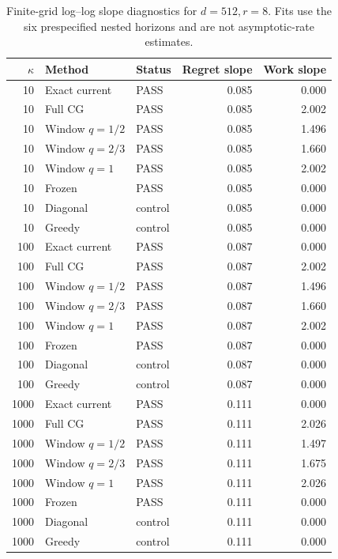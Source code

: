 \begin{table}[p]
\centering\scriptsize
\begin{tabular}{rllrr}
\toprule
$\kappa$ & Method & Status & Regret slope & Work slope \\
\midrule
10 & Exact current & PASS & 0.085 & 0.000 \\
10 & Full CG & PASS & 0.085 & 2.002 \\
10 & Window $q=1/2$ & PASS & 0.085 & 1.496 \\
10 & Window $q=2/3$ & PASS & 0.085 & 1.660 \\
10 & Window $q=1$ & PASS & 0.085 & 2.002 \\
10 & Frozen & PASS & 0.085 & 0.000 \\
10 & Diagonal & control & 0.085 & 0.000 \\
10 & Greedy & control & 0.085 & 0.000 \\
100 & Exact current & PASS & 0.087 & 0.000 \\
100 & Full CG & PASS & 0.087 & 2.002 \\
100 & Window $q=1/2$ & PASS & 0.087 & 1.496 \\
100 & Window $q=2/3$ & PASS & 0.087 & 1.660 \\
100 & Window $q=1$ & PASS & 0.087 & 2.002 \\
100 & Frozen & PASS & 0.087 & 0.000 \\
100 & Diagonal & control & 0.087 & 0.000 \\
100 & Greedy & control & 0.087 & 0.000 \\
1000 & Exact current & PASS & 0.111 & 0.000 \\
1000 & Full CG & PASS & 0.111 & 2.026 \\
1000 & Window $q=1/2$ & PASS & 0.111 & 1.497 \\
1000 & Window $q=2/3$ & PASS & 0.111 & 1.675 \\
1000 & Window $q=1$ & PASS & 0.111 & 2.026 \\
1000 & Frozen & PASS & 0.111 & 0.000 \\
1000 & Diagonal & control & 0.111 & 0.000 \\
1000 & Greedy & control & 0.111 & 0.000 \\
\bottomrule
\end{tabular}
\caption{Finite-grid log--log slope diagnostics for $d=512,r=8$.  Fits use the six prespecified nested horizons and are not asymptotic-rate estimates.}
\label{tab:certified-scaling-fits-5}
\end{table}

